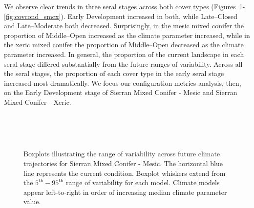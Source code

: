 We observe clear trends in three seral stages across both cover types (Figures~\ref{fig:covcond_smcm}-\ref{fig:covcond_smcx}). Early Development increased in both, while Late--Closed and Late--Moderate both decreased. Surprisingly, in the mesic mixed conifer the proportion of Middle--Open increased as the climate parameter increased, while in the xeric mixed conifer the proportion of Middle--Open decreased as the climate parameter increased. In general, the proportion of the current landscape in each seral stage differed substantially from the future ranges of variability. Across all the seral stages, the proportion of each cover type in the early seral stage increased most dramatically. We focus our configuration metrics analysis, then, on the Early Development stage of Sierran Mixed Conifer - Mesic and Sierran Mixed Conifer - Xeric.



\begin{figure}[htbp]
 \captionsetup[subfigure]{labelformat=empty}
  \centering
   \\
   \\
     \\
  \caption{Boxplots illustrating the range of variability across future climate trajectories for Sierran Mixed Conifer - Mesic. The horizontal blue line represents the current condition. Boxplot whiskers extend from the $5^{\text{th}} - 95^{\text{th}}$ range of variability for each model. Climate models appear left-to-right in order of increasing median climate parameter value.}
  \label{fig:covcond_smcm}
\end{figure} %

